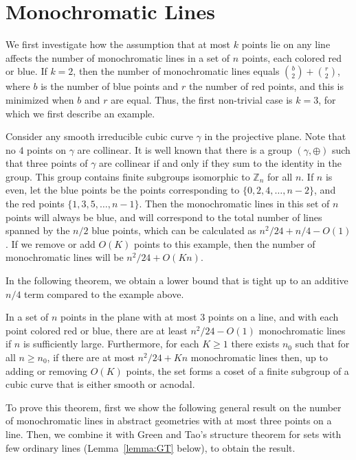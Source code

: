 \documentclass[a4paper,11pt,leqno]{article}
\begin{document}
\section{Monochromatic Lines}
We first investigate how the assumption that at most $k$ points lie on any line affects the number of monochromatic lines in a set of $n$ points, each colored red or blue.
If $k=2$, then the number of monochromatic lines equals $\binom{b}{2}+\binom{r}{2}$, where $b$ is the number of blue points and $r$ the number of red points, and this is minimized when $b$ and $r$ are equal.
Thus, the first non-trivial case is $k=3$, for which we first describe an example.
\begin{example}\label{ex:cubic}
Consider any smooth irreducible cubic curve $\gamma$ in the projective plane.
Note that no $4$ points on $\gamma$ are collinear.
It is well known that there is a group $(\gamma,\oplus)$ such that three points of $\gamma$ are collinear if and only if they sum to the identity in the group.
This group contains finite subgroups isomorphic to $\mathbb{Z}_n$ for all $n$.
If $n$ is even, let the blue points be the points corresponding to $\{0,2,4,\dots,n-2\}$, and the red points $\{1,3,5,\dots,n-1\}$.
Then the monochromatic lines in this set of $n$ points will always be blue, and will correspond to the total number of lines spanned by the $n/2$ blue points, which can be calculated as $n^2/24 + n/4 - O(1)$.
If we remove or add $O(K)$ points to this example, then the number of monochromatic lines will be $n^2/24 +O(Kn)$.
\end{example}


In the following theorem, we obtain a lower bound that is tight up to an additive $n/4$ term compared to the example above.

\begin{theorem}\label{thm:1}
In a set of $n$ points in the plane with at most $3$ points on a line, and with each point colored red or blue, there are at least $n^2/24-O(1)$ monochromatic lines if $n$ is sufficiently large.
Furthermore, for each $K\geq 1$ there exists $n_0$ such that for all $n\geq n_0$, if there are at most $n^2/24 +Kn$ monochromatic lines then, up to adding or removing $O(K)$ points, 
the set forms a coset of a finite subgroup of a cubic curve that is either smooth or acnodal.
\end{theorem}

To prove this theorem, first we show the following general result on the number of monochromatic lines in abstract geometries with at most three points on a line.
Then, we combine it with Green and Tao's structure theorem for sets with few ordinary lines \cite{greentao2013} (Lemma~\ref{lemma:GT} below), to obtain the result. 
\end{document}
